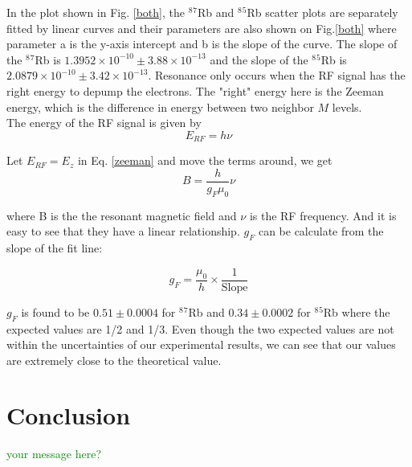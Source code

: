 \documentclass[prb,preprint]{revtex4-1}
\begin{document}
In the plot shown in Fig. \ref{both}, the $^8$$^7$Rb and $^8$$^5$Rb scatter plots are separately fitted by linear curves and their parameters are also shown on Fig.\ref{both} where parameter a is the y-axis intercept and b is the slope of the curve. The slope of the $^8$$^7$Rb is $1.3952\times 10^{-10} \pm 3.88 \times 10^{-13}$ and the slope of the $^8$$^5$Rb is $2.0879 \times 10^{-10} \pm 3.42 \times 10^{-13}$. Resonance only occurs when the RF signal has the right energy to depump the electrons. The "right" energy here is the Zeeman energy, which is the difference in energy between two neighbor $M$ levels. \\

The energy of the RF signal is given by
\begin{equation}
E_{RF}=h\nu
\label{rfenergy}
\end{equation}

Let $E_{RF}=E_{z}$ in Eq. \ref{zeeman} and move the terms around, we get
\begin{equation}
B=\frac{h}{g_{F}\mu_{0}}\nu
\label{bandf}
\end{equation}

where B is the the resonant magnetic field and $\nu$ is the RF frequency. And it is easy to see that they have a linear relationship. $g_{F}$ can be calculate from the slope of the fit line:

\begin{equation}
g_{F}=\frac{\mu_{0}}{h} \times \frac{1}{\textrm{Slope}}
\label{gf}
\end{equation}

$g_{F}$ is found to be $0.51\pm0.0004$ for $^8$$^7$Rb and $0.34\pm0.0002$ for $^8$$^5$Rb where the expected values are 1/2 and 1/3. Even though the two expected values are not within the uncertainties of our experimental results, we can see that our values are extremely close to the theoretical value.

\section{Conclusion}

\textcolor{green}{your message here?}


\end{document}
